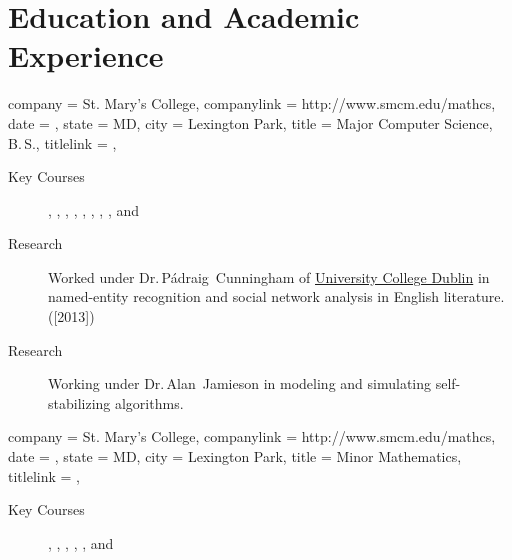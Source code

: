 \documentclass[
textout=\jobname.cv.txt,
textout preamble = preamble.txt,
]{bettercv}
\begin{document}
\section{Education and Academic Experience}
\begin{position}
  {
    company = St. Mary's College,
    companylink = http://www.smcm.edu/mathcs,
    date    = ,
    state   = MD,
    city    = Lexington Park,
    title   = {Major \Dash Computer Science, B.\,S.},
    titlelink = \transcript,
  }

\begin{description}
\item[Key Courses]
  ,
  ,
  ,
  ,
  ,
  ,
  ,
  ,
  and 
\item[Research] Worked under
  Dr.\,P\'adraig~Cunningham of \href{http://www.ucd.ie}{University
    College Dublin} in named-entity recognition and social network
  analysis in English literature. ([2013])
\item[Research] Working under Dr.\,Alan~Jamieson in modeling and
  simulating self-stabilizing algorithms.
\end{description}
\end{position}

\begin{position}
  {
    company = St. Mary's College,
    companylink = http://www.smcm.edu/mathcs,
    date    = ,
    state   = MD,
    city    = Lexington Park,
    title   = Minor \Dash Mathematics,
    titlelink = \transcript,
  }

  \begin{description}
  \item[Key Courses]
    ,
    ,
    ,
    ,
    ,
    and 
  \end{description}
\end{position}
\end{document}
